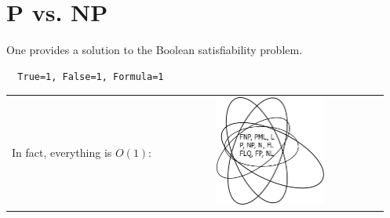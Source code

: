 \setcounter{section}{0}

\section{P vs. NP}
One provides a solution to 
the Boolean satisfiability 
problem.
\begin{center}
  \begin{verbatim}
  True=1, False=1, Formula=1
  \end{verbatim}
\end{center}
\vspace{-0.4cm}
\begin{center}
  \begin{tabular}{cc}
    \begin{minipage}{0.4\textwidth}
      In fact, everything is $O(1)$:
    \end{minipage}
    &
    \begin{minipage}{0.6\textwidth}
      \includegraphics[width=0.5\textwidth]{venn.png}
    \end{minipage}
  \end{tabular}
\end{center}


